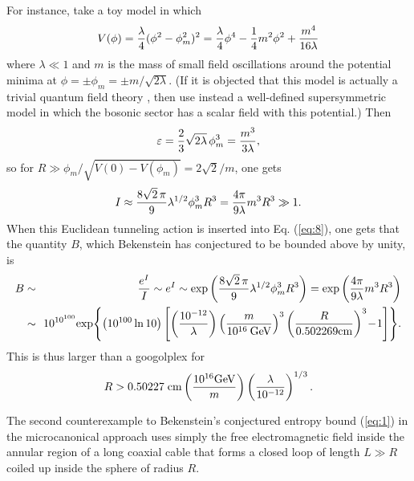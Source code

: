 \documentclass[a4paper,12pt]{article}
\begin{document}
	For instance, take a toy model in which
 \begin{equation}
 V(\phi) = {\lambda\over 4}(\phi^2-\phi_m^2)^2
         = {\lambda\over 4}\phi^4 - {1\over 4}m^2\phi^2
	     + {m^4\over 16\lambda}
 \label{eq:9}
 \end{equation}
where $\lambda \ll 1$ and $m$
is the mass of small field oscillations
around the potential minima at
$\phi = \pm\phi_m = \pm m/\sqrt{2\lambda}$.
(If it is objected that this model
is actually a trivial quantum field theory
\cite{Cal,Bek9},
then use instead a well-defined supersymmetric model in which
the bosonic sector has a scalar field with this potential.)
Then
 \begin{equation}
 \varepsilon = {2\over 3}\sqrt{2\lambda}\,\phi_m^3
 = {m^3 \over 3\lambda},
 \label{eq:10}
 \end{equation}
so for $R \gg \phi_m/\sqrt{V(0)-V(\phi_m)} =
2\sqrt{2}/m$,
one gets
 \begin{equation}
 I \approx {8\sqrt{2}\,\pi\over 9}\lambda^{1/2}\phi_m^3 R^3
    = {4\pi\over 9\lambda}m^3 R^3 \gg 1.
 \label{eq:11}
 \end{equation}
When this Euclidean tunneling action is inserted
into Eq. (\ref{eq:8}), one gets that
the quantity $B$, which Bekenstein has conjectured
to be bounded above by unity, is
 \begin{eqnarray}
 B & \sim & {e^I \over I} \sim e^I
   \sim \exp{\left({8\sqrt{2}\,\pi\over 9}
     \lambda^{1/2}\phi_m^3 R^3 \right)}
   = \exp{\left({4\pi\over 9\lambda}m^3 R^3 \right)} \nonumber \\
   & \sim \!\!\! & \!\! 10^{10^{100}} \! \exp{\!\left\{ \left( 10^{100}\ln{10} \right)
   \left[ \left( {10^{-12}\over\lambda} \right)
   \left( {m\over 10^{16}\: {\rm GeV}} \right)^3
   \left( {R\over 0.502269{\rm cm}} \right)^3 \! - \! 1 \right] \right\} }.
 \label{eq:12}
 \end{eqnarray}
This is thus larger than a googolplex for
 \begin{equation}
 R > 0.50227 \; {\rm cm}\left({10^{16}{\rm GeV}\over m}\right)
     \left({\lambda\over 10^{-12}}\right)^{1/3}.
 \label{eq:13}
 \end{equation}

	The second counterexample to Bekenstein's
conjectured entropy bound (\ref{eq:1}) in the microcanonical
approach uses simply the free electromagnetic field
inside the annular region of a long coaxial cable
that forms a closed loop of length $L \gg R$
coiled up inside the sphere of radius $R$.
\end{document}
